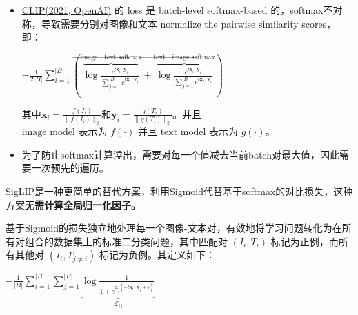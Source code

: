 \documentclass[zihao=false,fontset=windows]{ctexart}
\newcommand{\bigmath}[1]{%
  \begin{center}\large$\displaystyle #1$\end{center}%
}
\begin{document}
\begin{itemize}

\item \href{https://scnajei2ds6y.feishu.cn/wiki/FKvTwjSHxiVHBokxd5ncXxuanch}{CLIP(2021, OpenAI)} 的 loss 是 batch-level softmax-based 的，softmax不对称，导致需要分别对图像和文本 normalize the pairwise similarity scores，即：

\bigmath{-\frac{1}{2|B|}\sum_{i=1}^{|B|}(\overbrace{\log\frac{e^{t \mathbf{x}_i\cdot \mathbf{y}_i}}{\sum_{j=1}^{|B|}e^{t \mathbf{x}_i\cdot \mathbf{y}_j}}}^{\text{image}\to\text{text softmax}}+\overbrace{\log\frac{e^{t \mathbf{x}_i\cdot \mathbf{y}_i}}{\sum_{j=1}^{|B|}e^{t \mathbf{x}_j\cdot \mathbf{y}_i}}}^{\text{text}\to\text{image softmax}})}

其中$\mathbf{x}_i=\frac{f(I_i)}{\|f(I_i)\|_2}$和$\mathbf{y}_i=\frac{g(T_i)}{\|g(T_i)\|_2}$。并且 $\text{image model 表示为 }f(\cdot)\text{ 并且 text model 表示为 }g(\cdot)$。\par

\item 为了防止softmax计算溢出，需要对每一个值减去当前batch对最大值，因此需要一次预先的遍历。

\end{itemize}

\par{}\vspace{1em}\par\vspace{0.28em}

\par{}\vspace{1em}\par\vspace{0.28em}

SigLIP是一种更简单的替代方案，利用Sigmoid代替基于softmax的对比损失，这种方案\textbf{无需计算全局归一化因子。}\par

基于Sigmoid的损失独立地处理每一个图像-文本对，有效地将学习问题转化为在所有对组合的数据集上的标准二分类问题，其中匹配对 $(I_i,T_i)$ 标记为正例，而所有其他对 $(I_i,T_{j\neq i})$ 标记为负例。其定义如下：\par

\bigmath{-\frac{1}{|B|}\sum_{i=1}^{|B|}\sum_{j=1}^{|B|}\underbrace{\log\frac{1}{1+e^{z_{ij}(-t \mathbf{x}_i\cdot \mathbf{y}_j+b)}}}_{\mathcal L_{ij}}}
\end{document}
